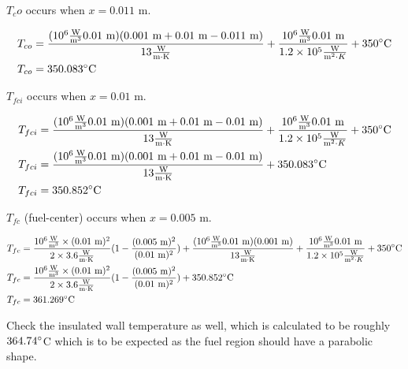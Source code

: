 \documentclass{article}
\begin{document}
$T_co$ occurs when $x = 0.011$ m.

\begin{align}
    T_{co} &= \frac{(10^{6} \frac{\text{W}}{\text{m}^3} 0.01 \text{ m})(0.001 \text{ m} + 0.01 \text{ m} - 0.011 \text{ m})}{13 \frac{\text{W}}{\text{m} \cdot \text{K}}} + \frac{10^{6} \frac{\text{W}}{\text{m}^3} 0.01 \text{ m}}{1.2 \times 10^{5} \frac{\text{W}}{\text{m}^2 \cdot K}} + 350 \degree \text{C} \\
    T_{co} &= 350.083 \degree \text{C}
\end{align}

$T_{fci}$ occurs when $x = 0.01$ m.

\begin{align}
    T_{fci} &= \frac{(10^{6} \frac{\text{W}}{\text{m}^3} 0.01 \text{ m})(0.001 \text{ m} + 0.01 \text{ m} - 0.01 \text{ m})}{13 \frac{\text{W}}{\text{m} \cdot \text{K}}} + \frac{10^{6} \frac{\text{W}}{\text{m}^3} 0.01 \text{ m}}{1.2 \times 10^{5} \frac{\text{W}}{\text{m}^2 \cdot K}} + 350 \degree \text{C} \\
    T_{fci} &= \frac{(10^{6} \frac{\text{W}}{\text{m}^3} 0.01 \text{ m})(0.001 \text{ m} + 0.01 \text{ m} - 0.01 \text{ m})}{13 \frac{\text{W}}{\text{m} \cdot \text{K}}} + 350.083 \degree \text{C} \\
    T_{fci} &= 350.852 \degree \text{C}
\end{align}

$T_{fc}$ (fuel-center) occurs when $x=0.005$ m.

\begin{align}
    T_{fc} &= \frac{10^{6} \frac{\text{W}}{\text{m}^3} \times (0.01 \text{ m})^2}{2 \times 3.6 \frac{\text{W}}{\text{m} \cdot \text{K}}} (1 - \frac{(0.005 \text{ m})^2}{(0.01 \text{ m})^2}) + \frac{(10^{6} \frac{\text{W}}{\text{m}^3} 0.01 \text{ m})(0.001 \text{ m})}{13 \frac{\text{W}}{\text{m} \cdot \text{K}}} + \frac{10^{6} \frac{\text{W}}{\text{m}^3} 0.01 \text{ m}}{1.2 \times 10^{5} \frac{\text{W}}{\text{m}^2 \cdot K}} + 350 \degree \text{C} \\
    T_{fc} &= \frac{10^{6} \frac{\text{W}}{\text{m}^3} \times (0.01 \text{ m})^2}{2 \times 3.6 \frac{\text{W}}{\text{m} \cdot \text{K}}} (1 - \frac{(0.005 \text{ m})^2}{(0.01 \text{ m})^2}) + 350.852 \degree \text{C}\\
    T_{fc} &= 361.269 \degree \text{C}
\end{align}

Check the insulated wall temperature as well, which is calculated to be roughly $364.74 \degree$C which is to be expected as the fuel region should have a parabolic shape.
\end{document}
